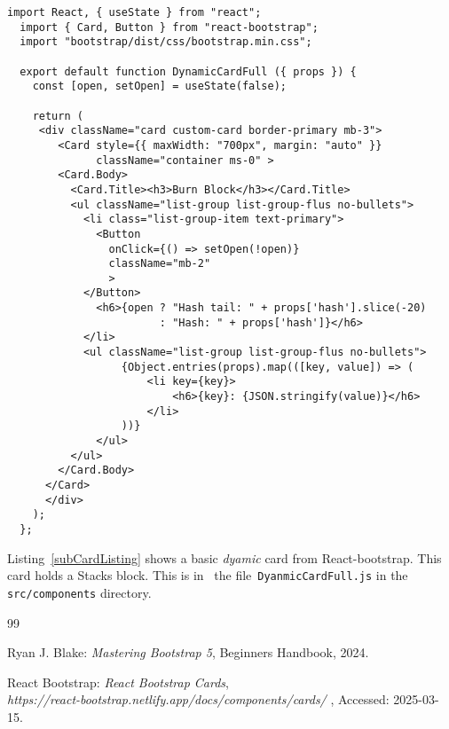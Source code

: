 \documentclass[12pt]{article}
\begin{document}
%
%
\pagebreak
%
%
%
\begin{lstlisting}[label=subCardListing,style=JSES6Base, caption={Basic Dynamic Card for a Stacks block}]
  import React, { useState } from "react";
  import { Card, Button } from "react-bootstrap";
  import "bootstrap/dist/css/bootstrap.min.css";
  
  export default function DynamicCardFull ({ props }) {
    const [open, setOpen] = useState(false);
  
    return (
     <div className="card custom-card border-primary mb-3">
        <Card style={{ maxWidth: "700px", margin: "auto" }} 
              className="container ms-0" >
        <Card.Body>
          <Card.Title><h3>Burn Block</h3></Card.Title>
          <ul className="list-group list-group-flus no-bullets">
            <li class="list-group-item text-primary">
              <Button
                onClick={() => setOpen(!open)}
                className="mb-2"
                >
            </Button>
              <h6>{open ? "Hash tail: " + props['hash'].slice(-20) 
                        : "Hash: " + props['hash']}</h6>
            </li>
            <ul className="list-group list-group-flus no-bullets">
                  {Object.entries(props).map(([key, value]) => (
                      <li key={key}>
                          <h6>{key}: {JSON.stringify(value)}</h6>
                      </li>
                  ))}
              </ul>
          </ul>
        </Card.Body>
      </Card>
      </div>
    );
  };
\end{lstlisting}

Listing~\ref{subCardListing} shows a basic {\em dyamic} card from React-bootstrap.
This card holds a Stacks block.
This is in~ the file~\lstinline[language=bash]|DyanmicCardFull.js| in the \lstinline[language=bash]|src/components| directory.




%
%
%
%
\begin {thebibliography}{99}
%



 Ryan J. Blake:
	      {\em Mastering Bootstrap 5},
	     Beginners Handbook,
       2024.

       
 React Bootstrap:
        {\em React Bootstrap Cards},\\
        {\em https://react-bootstrap.netlify.app/docs/components/cards/ },
       Accessed: 2025-03-15.

\end {thebibliography}
\end{document}
